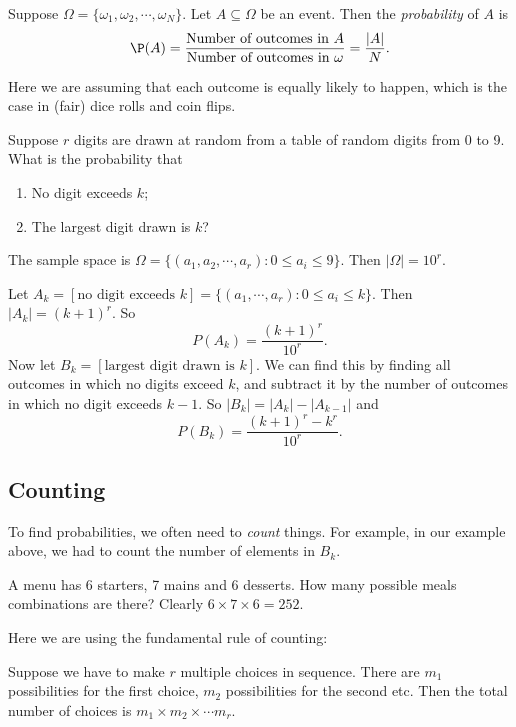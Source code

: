 \documentclass[a4paper]{article}
\begin{document}
\begin{defi}[Probability]
  Suppose $\Omega = \{\omega_1,\omega_2, \cdots, \omega_N\}$. Let $A\subseteq \Omega$ be an event. Then the \emph{probability} of $A$ is
  \[
    \P(A) = \frac{\text{Number of outcomes in } A}{\text{Number of outcomes in }\omega} = \frac{|A|}{N}.
  \]
\end{defi}
Here we are assuming that each outcome is equally likely to happen, which is the case in (fair) dice rolls and coin flips.

\begin{eg}
  Suppose $r$ digits are drawn at random from a table of random digits from 0 to 9. What is the probability that
  \begin{enumerate}
    \item No digit exceeds $k$;
    \item The largest digit drawn is $k$?
  \end{enumerate}

  The sample space is $\Omega = \{(a_1, a_2, \cdots, a_r): 0 \leq a_i \leq 9\}$. Then $|\Omega| = 10^r$.

  Let $A_k = [\text{no digit exceeds }k] = \{(a_1, \cdots, a_r): 0 \leq a_i \leq k\}$. Then $|A_k| = (k + 1)^r$. So
  \[
    P(A_k) = \frac{(k + 1)^r}{10^r}.
  \]
  Now let $B_k = [\text{largest digit drawn is }k]$. We can find this by finding all outcomes in which no digits exceed $k$, and subtract it by the number of outcomes in which no digit exceeds $k - 1$. So $|B_k| = |A_k| - |A_{k - 1}|$ and
  \[
    P(B_k) = \frac{(k + 1)^r - k^r}{10^r}.
  \]
\end{eg}
\subsection{Counting}
To find probabilities, we often need to \emph{count} things. For example, in our example above, we had to count the number of elements in $B_k$.
\begin{eg}
  A menu has 6 starters, 7 mains and 6 desserts. How many possible meals combinations are there? Clearly $6 \times 7 \times 6 = 252$.
\end{eg}
Here we are using the fundamental rule of counting:
\begin{thm}
  Suppose we have to make $r$ multiple choices in sequence. There are $m_1$ possibilities for the first choice, $m_2$ possibilities for the second etc. Then the total number of choices is $m_1\times m_2\times \cdots m_r$.
\end{thm}
\end{document}
